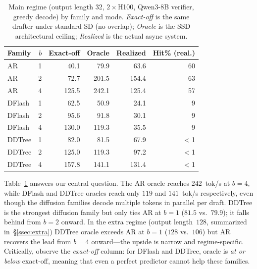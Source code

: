 \documentclass{article}
\begin{document}
\begin{table}[t]
  \caption{Main regime (output length 32, $2{\times}$H100, Qwen3-8B verifier, greedy decode) by family and mode.
  \emph{Exact-off} is the same drafter under standard SD (no overlap); \emph{Oracle} is the SSD architectural ceiling; \emph{Realized} is the actual async system.}
  \label{tab:main}
  \begin{center}
    \begin{small}
      \setlength{\tabcolsep}{4pt}
      \begin{tabular}{@{}lrrrrr@{}}
        \toprule
        Family & $b$ & Exact-off & Oracle & Realized & Hit\% (real.) \\
        \midrule
        AR      & 1 &  40.1 &  79.9 &  63.6 & 60 \\
        AR      & 2 &  72.7 & 201.5 & 154.4 & 63 \\
        AR      & 4 & 125.5 & 242.1 & 125.4 & 57 \\
        \midrule
        DFlash  & 1 &  62.5 &  50.9 &  24.1 &  9 \\
        DFlash  & 2 &  95.6 &  91.8 &  30.1 &  9 \\
        DFlash  & 4 & 130.0 & 119.3 &  35.5 &  9 \\
        \midrule
        DDTree  & 1 &  82.0 &  81.5 &  67.9 &  $<$1 \\
        DDTree  & 2 & 125.0 & 119.3 &  97.2 &  $<$1 \\
        DDTree  & 4 & 157.8 & 141.1 & 131.4 &  $<$1 \\
        \bottomrule
      \end{tabular}
    \end{small}
  \end{center}
\end{table}

Table~\ref{tab:main} answers our central question.
The AR oracle reaches $242$~tok/s at $b{=}4$, while DFlash and DDTree oracles reach only $119$ and $141$~tok/s respectively, even though the diffusion families decode multiple tokens in parallel per draft.
DDTree is the strongest diffusion family but only ties AR at $b{=}1$ ($81.5$ vs.\ $79.9$); it falls behind from $b{=}2$ onward.
In the extra regime (output length~$128$, summarized in~\S\ref{ssec:extra}) DDTree oracle exceeds AR at $b{=}1$ ($128$ vs.\ $106$) but AR recovers the lead from $b{=}4$ onward---the upside is narrow and regime-specific.
Critically, observe the \emph{exact-off} column: for DFlash and DDTree, oracle is \emph{at or below} exact-off, meaning that even a perfect predictor cannot help these families.
\end{document}
